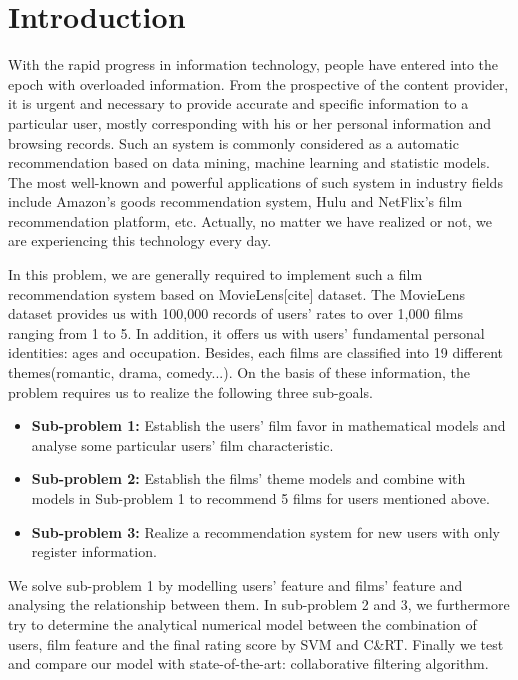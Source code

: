 
\section{Introduction}
With the rapid progress in information technology, people have entered into the epoch with overloaded information. From the prospective of the content provider, it is urgent and necessary to provide accurate and specific information to a particular user, mostly corresponding with his or her personal information and browsing records. Such an system is commonly considered as a automatic recommendation based on data mining, machine learning and statistic models\cite{adomavicius2005toward}. The most well-known and powerful applications of such system in industry fields include Amazon's goods recommendation system, Hulu and NetFlix's film recommendation platform, etc. Actually, no matter we have realized or not, we are experiencing this technology every day. 

In this problem, we are generally required to implement such a film recommendation system based on MovieLens[cite] dataset. The MovieLens dataset provides us with 100,000 records of users' rates to over 1,000 films ranging from 1 to 5. In addition, it offers us with users' fundamental personal identities: ages and occupation. Besides, each films are classified into 19 different themes(romantic, drama, comedy...). On the basis of these information, the problem requires us to realize the following three sub-goals.
\begin{itemize}
\item \textbf{Sub-problem 1:} Establish the users' film favor in mathematical models and analyse some particular users' film characteristic. 
\item \textbf{Sub-problem 2:} Establish the films' theme models and combine with models in Sub-problem 1 to recommend 5 films for users mentioned above.  
\item\textbf{ Sub-problem 3:} Realize a recommendation system for new users with only register information.
\end{itemize} 

We solve sub-problem 1 by modelling users' feature and films' feature and analysing the relationship between them. In sub-problem 2 and 3, we furthermore try to determine the analytical numerical model between the combination of users, film feature and the final rating score by SVM and C\&RT. Finally we test and compare our model with state-of-the-art: collaborative filtering algorithm.

